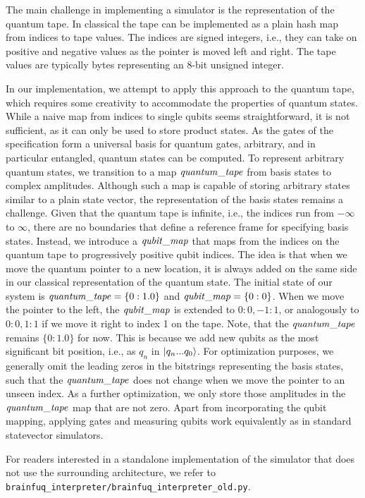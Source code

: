 The main challenge in implementing a \bfq{} simulator is the representation of the quantum tape.
In classical \bfck{} the tape can be implemented as a plain hash map from indices to tape values.
The indices are signed integers, i.e., they can take on positive and negative values as the pointer is moved left and right.
The tape values are typically bytes representing an 8-bit unsigned integer.

In our implementation, we attempt to apply this approach to the quantum tape, which requires some creativity to accommodate the properties of quantum states.
While a naive map from indices to single qubits seems straightforward, it is not sufficient, as it can only be used to store product states.
As the gates of the \bfq{} specification form a universal basis for quantum gates, arbitrary, and in particular entangled, quantum states can be computed.
To represent arbitrary quantum states, we transition to a map $\mathit{quantum\_tape}$ from basis states to complex amplitudes.
Although such a map is capable of storing arbitrary states similar to a plain state vector, the representation of the basis states remains a challenge.
Given that the quantum tape is infinite, i.e., the indices run from $-\infty$ to $\infty$, there are no boundaries that define a reference frame for specifying basis states.
Instead, we introduce a $\mathit{qubit\_map}$ that maps from the indices on the quantum tape to progressively positive qubit indices.
The idea is that when we move the quantum pointer to a new location, it is always added on the same side in our classical representation of the quantum state.
The initial state of our system is $\mathit{quantum\_tape} = \{0: 1.0\}$ and $\mathit{qubit\_map} = \{0: 0\}$.
When we move the pointer to the left, the  $\mathit{qubit\_map}$ is extended to ${0: 0, -1: 1}$, or analogously to ${0: 0, 1: 1}$ if we move it right to index 1 on the tape.
Note, that the $\mathit{quantum\_tape}$ remains $\{0: 1.0\}$ for now.
This is because we add new qubits as the most significant bit position, i.e., as $q_n$ in $\ket{q_n ... q_0}$.
For optimization purposes, we generally omit the leading zeros in the bitstrings representing the basis states, such that the $\mathit{quantum\_tape}$ does not change when we move the pointer to an unseen index.
As a further optimization, we only store those amplitudes in the $\mathit{quantum\_tape}$ map that are not zero.
Apart from incorporating the qubit mapping, applying gates and measuring qubits work equivalently as in standard statevector simulators.

For readers interested in a standalone implementation of the simulator that does not use the surrounding architecture, we refer to \texttt{brainfuq\_interpreter/brainfuq\_interpreter\_old.py}.

